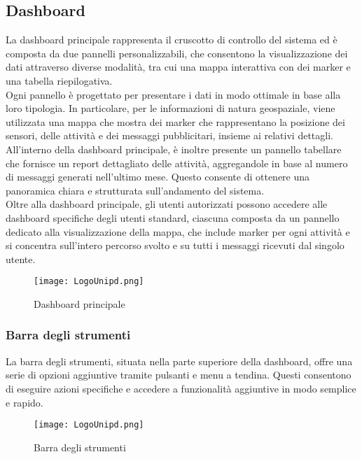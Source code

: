 \documentclass[10pt]{article}
\begin{document}
\begin{justify}
\subsection{Dashboard}
La dashboard principale rappresenta il cruscotto di controllo del sistema ed è composta da due pannelli personalizzabili, che consentono la visualizzazione dei dati attraverso diverse modalità, tra cui una mappa interattiva con dei marker e una tabella riepilogativa.\\
Ogni pannello è progettato per presentare i dati in modo ottimale in base alla loro tipologia. In particolare, per le informazioni di natura geospaziale, viene utilizzata una mappa che mostra dei marker che rappresentano la posizione dei sensori, delle attività e dei messaggi pubblicitari, insieme ai relativi dettagli. All'interno della dashboard principale, è inoltre presente un pannello tabellare che fornisce un report dettagliato delle attività, aggregandole in base al numero di messaggi generati nell'ultimo mese. Questo consente di ottenere una panoramica chiara e strutturata sull'andamento del sistema.\\
Oltre alla dashboard principale, gli utenti autorizzati possono accedere alle dashboard specifiche degli utenti standard, ciascuna composta da un pannello dedicato alla visualizzazione della mappa, che include marker per ogni attività e si concentra sull'intero percorso svolto e su tutti i messaggi ricevuti dal singolo utente.\\
\begin{figure}[H]
    \centering
    \texttt{[image: LogoUnipd.png]}
    \caption{Dashboard principale}
\end{figure}

    \subsubsection{Barra degli strumenti} %
    La barra degli strumenti, situata nella parte superiore della dashboard, offre una serie di opzioni aggiuntive tramite pulsanti e menu a tendina. Questi consentono di eseguire azioni specifiche e accedere a funzionalità aggiuntive in modo semplice e rapido.\\
    \begin{figure}[H]
    \centering
    \texttt{[image: LogoUnipd.png]}
    \caption{Barra degli strumenti}
    \end{figure}


\end{justify}
\end{document}
